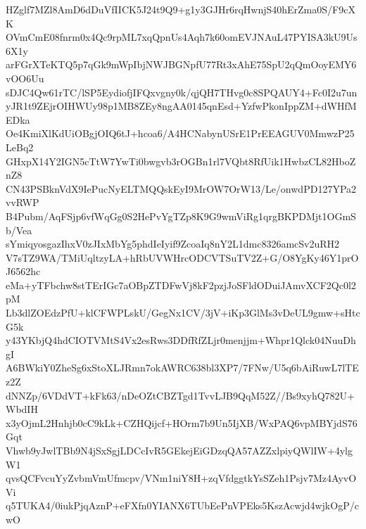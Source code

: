 HZglf7MZl8AmD6dDuVfIICK5J24t9Q9+g1y3GJHr6rqHwnjS40hErZma0S/F9cXK
OVmCmE08fnrm0x4Qc9rpML7xqQpnUs4Aqh7k60omEVJNAuL47PYISA3kU9Us6X1y
arFGrXTeKTQ5p7qGk9mWpIbjNWJBGNpfU77Rt3xAhE75SpU2qQmOoyEMY6vOO6Uu
sDJC4Qw61rTC/lSP5EydiofjIFQxvgny0k/qjQH7THvg0c8SPQAUY4+Fc0I2u7un
yJR1t9ZEjrOIHWUy98p1MB8ZEy8ngAA0145qnEsd+YzfwPkonIppZM+dWHfMEDka
Oe4KmiXlKdUiOBgjOIQ6tJ+hcoa6/A4HCNabynUSrE1PrEEAGUV0MmwzP25LeBq2
GHxpX14Y2IGN5cTtW7YwTi0bwgvb3rOGBn1rl7VQbt8RfUik1HwbzCL82HboZnZ8
CN43PSBknVdX9IePucNyELTMQQskEyI9MrOW7OrW13/Le/onwdPD127YPa2vvRWP
B4Pubm/AqFSjp6vfWqGg0S2HePvYgTZp8K9G9wmViRg1qrgBKPDMjt1OGmSb/Vea
sYmiqyosgazIhxV0zJIxMbYg5phdIeIyif9ZcoaIq8nY2L1dmc8326amcSv2uRH2
V7sTZ9WA/TMiUqltzyLA+hRbUVWHrcODCVTSuTV2Z+G/O8YgKy46Y1prOJ6562hc
eMa+yTFbchw8stTErIGc7aOBpZTDFwVj8kF2pzjJoSFldODuiJAmvXCF2Qc0l2pM
Lb3dlZOEdzPfU+klCFWPLskU/GegNx1CV/3jV+iKp3GlMs3vDeUL9gmw+sHtcG5k
y43YKbjQ4hdCIOTVMtS4Vx2esRws3DDfRfZLjr0menjjm+Whpr1Qlck04NuuDhgI
A6BWkiY0ZheSg6xStoXLJRmn7okAWRC638bl3XP7/7FNw/U5q6bAiRuwL7lTEz2Z
dNNZp/6VDdVT+kFk63/nDeOZtCBZTgd1TvvLJB9QqM52Z//Bs9xyhQ782U+WbdIH
x3yOjmL2Hnhjb0cC9kLk+CZHQijcf+HOrm7b9Un5IjXB/WxPAQ6vpMBYjdS76Gqt
Vhwb9yJwlTBb9N4jSxSgjLDCcIvR5GEkejEiGDzqQA57AZZxlpiyQWlIW+4ylgW1
qvsQCFvcuYyZvbmVmUfmcpv/VNm1niY8H+zqVfdggtkYsSZeh1Psjv7Mz4AyvOVi
q5TUKA4/0iukPjqAznP+eFXfn0YIANX6TUbEePnVPEks5KszAcwjd4wjkOgP/cwO
